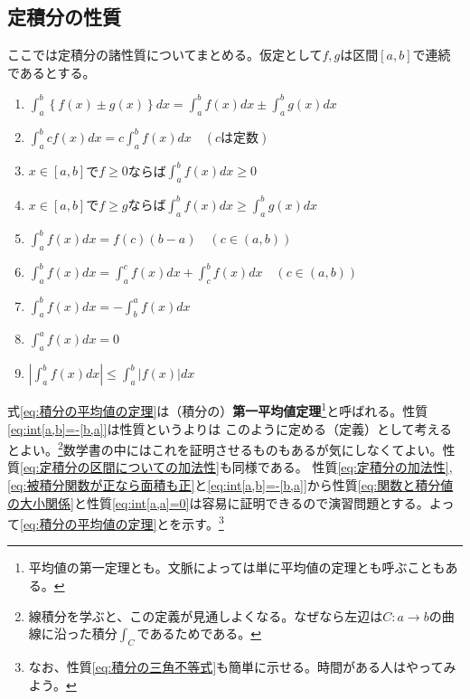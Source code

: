\documentclass[a4j,dvipdfmx]{jsarticle}
\begin{document}
            \subsection{定積分の性質}
                ここでは定積分の諸性質についてまとめる。仮定として$f,g$は区間$[a,b]$で連続であるとする。
                \begin{enumerate}\setcounter{enumi}{0}\renewcommand{\labelenumi}{(\arabic{enumi})}
                    \item $\displaystyle \int_a^b \left\{f(x)\pm g(x)\right\}dx=\int_a^b f(x)dx\pm\int_a^b g(x)dx\label{eq:定積分の加法性}$
                    \item $\displaystyle \int_a^b cf(x)dx=c\int_a^b f(x)dx \quad (c\text{は定数})$
                    \item $x\in [a,b]$で$f\geq 0$ならば$\displaystyle\int_a^b f(x)dx\geq 0 \label{eq:被積分関数が正なら面積も正}$
                    \item $x\in [a,b]$で$f\geq g$ならば$\displaystyle\int_a^b f(x)dx\geq \int_a^b g(x)dx\label{eq:関数と積分値の大小関係}$
                    \item $\displaystyle \int_a^b f(x)dx = f(c)(b-a)\quad (c\in (a,b))\label{eq:積分の平均値の定理}$
                    \item $\displaystyle \int_a^bf(x)dx=\int_a^c f(x)dx+\int_c^b f(x)dx \quad(c\in(a,b))\label{eq:定積分の区間についての加法性}$
                    \item $\displaystyle \int_a^b f(x)dx = -\int_b^a f(x)dx\label{eq:int[a,b]=-[b,a]}$
                    \item $\displaystyle \int_a^a f(x)dx=0\label{eq:int[a,a]=0}$
                    \item $\displaystyle \left|\int_{a}^{b}f(x)dx\right|\leq \int_{a}^{b}|f(x)|dx$\label{eq:積分の三角不等式}
                \end{enumerate}
                式\eqref{eq:積分の平均値の定理}は（積分の）\textbf{第一平均値定理}\footnote{平均値の第一定理とも。文脈によっては単に平均値の定理とも呼ぶこともある。}と呼ばれる。性質\eqref{eq:int[a,b]=-[b,a]}は性質というよりは
                このように定める（定義）として考えるとよい。\footnote{線積分を学ぶと、この定義が見通しよくなる。なぜなら左辺は$C:a\to b$の曲線に沿った積分$\int_C$であるためである。}数学書の中にはこれを証明させるものもあるが気にしなくてよい。性質\eqref{eq:定積分の区間についての加法性}も同様である。
                性質\eqref{eq:定積分の加法性},\eqref{eq:被積分関数が正なら面積も正}と\eqref{eq:int[a,b]=-[b,a]}から性質\eqref{eq:関数と積分値の大小関係}と性質\eqref{eq:int[a,a]=0}は容易に証明できるので演習問題とする。よって\eqref{eq:積分の平均値の定理}とを示す。\footnote{なお、性質\eqref{eq:積分の三角不等式}も簡単に示せる。時間がある人はやってみよう。}
\end{document}
